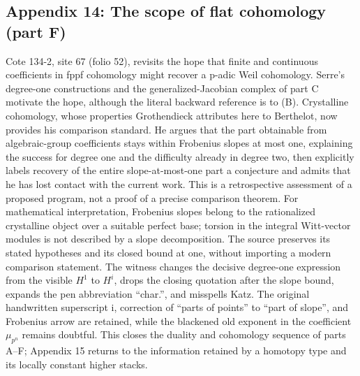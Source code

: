 \documentclass[10pt,oneside]{book}
\begin{document}
\subsection*{Appendix 14: The scope of flat cohomology (part F)}
Cote 134-2, site 67 (folio 52), revisits the hope that finite and continuous coefficients in fppf cohomology might recover a p-adic Weil cohomology. Serre's degree-one constructions and the generalized-Jacobian complex of part C motivate the hope, although the literal backward reference is to (B). Crystalline cohomology, whose properties Grothendieck attributes here to Berthelot, now provides his comparison standard. He argues that the part obtainable from algebraic-group coefficients stays within Frobenius slopes at most one, explaining the success for degree one and the difficulty already in degree two, then explicitly labels recovery of the entire slope-at-most-one part a conjecture and admits that he has lost contact with the current work. This is a retrospective assessment of a proposed program, not a proof of a precise comparison theorem. For mathematical interpretation, Frobenius slopes belong to the rationalized crystalline object over a suitable perfect base; torsion in the integral Witt-vector modules is not described by a slope decomposition. The source preserves its stated hypotheses and its closed bound at one, without importing a modern comparison statement. The witness changes the decisive degree-one expression from the visible $H^1$ to $H^i$, drops the closing quotation after the slope bound, expands the pen abbreviation ``char.'', and misspells Katz. The original handwritten superscript i, correction of ``parts of points'' to ``part of slope'', and Frobenius arrow are retained, while the blackened old exponent in the coefficient $\mu_{p^n}$ remains doubtful. This closes the duality and cohomology sequence of parts A--F; Appendix 15 returns to the information retained by a homotopy type and its locally constant higher stacks.
\end{document}
